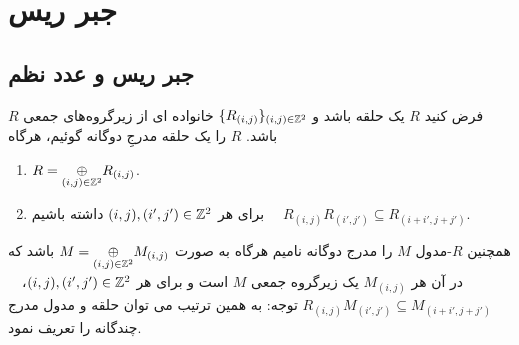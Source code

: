 \chapter{جبر ریس}
\thispagestyle{empty}
\newpage
\section{جبر ریس و عدد نظم}
\begin{definition}\label{bigraded-def}
فرض کنید $R$ یک حلقه باشد و $\{R_{(i,j)}\}_{(i,j)\in {\Bbb Z^2}}$ خانواده ای از زیرگروه‌های جمعی $R$ باشد.
$R$
را یک حلقه
مدرجِ دوگانه
گوئیم، هرگاه
\begin{enumerate}
\item
$R=\underset{(i,j)\in \Bbb Z^2}{\oplus } R_{(i,j)}$.
\item
برای هر $(i,j),(i',j') \in\Bbb Z^2$ داشته باشیم~~ $R_{(i,j)}R_{(i',j')}\subseteq R_{(i+i',j+j')}$.
\end{enumerate}
همچنین $R$-مدول $M$ را مدرج دوگانه نامیم هرگاه به صورت
$M=\underset{(i,j)\in \Bbb Z^2}{\oplus } M_{(i,j)}$
باشد که در آن هر
$M_{(i,j)}$
یک زیرگروه جمعی $M$ است و برای هر 
$(i,j),(i',j') \in\Bbb Z^2$،~~
$R_{(i,j)}M_{(i',j')}\subseteq M_{(i+i',j+j')}$
{\large{توجه:}}
به همین ترتیب می توان حلقه و مدول مدرج چندگانه
را تعریف نمود.
\end{definition}
